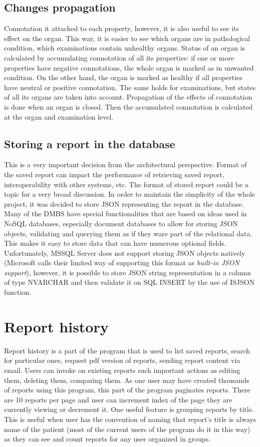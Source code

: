 \documentclass[12pt, twoside, openany]{report}
\theoremstyle{definition}
\begin{document}
\subsection{Changes propagation}
Connotation it attached to each property, however, it is also useful to see its effect on the organ. This way, it is easier to see which organs are in pathological condition, which examinations contain unhealthy organs. Status of an organ is calculated by accumulating connotation of all its properties: if one or more properties have negative connotations, the whole organ is marked as in unwanted condition. On the other hand, the organ is marked as healthy if all properties have neutral or positive connotation.
The same holds for examinations, but states of all its organs are taken into account. Propagation of the effects of connotation is done when an organ is closed. Then the accumulated connotation is calculated at the organ and examination level.

\subsection{Storing a report in the database}
This is a very important decision from the architectural perspective. Format of the saved report can impact the performance of retrieving saved report, interoperability with other systems, etc. The format of stored report could be a topic for a very broad discussion. In order to maintain the simplicity of the whole project, it was decided to store JSON representing the report in the database. Many of the DMBS have special functionalities that are based on ideas used in NoSQL databases, especially document databases to allow for storing JSON objects, validating and querying them as if they ware part of the relational data. This makes it easy to store data that can have numerous optional fields. Unfortunately, MSSQL Server does not support storing JSON objects natively (Microsoft calls their limited way of supporting this format as \textit{built-in JSON support}\cite{microsoft-json-support}), however, it is possible to store JSON string representation in a column of type NVARCHAR and then validate it on SQL INSERT by the use of ISJSON function.

\section{Report history}
Report history is a part of the program that is used to list saved reports, search for particular ones, request pdf version of reports, sending report content via email. Users can invoke on existing reports such important actions as editing them, deleting them, comparing them. As one user may have created thousands of reports using this program, this part of the program paginates reports. There are 10 reports per page and user can increment index of the page they are currently viewing or decrement it. 
One useful feature is grouping reports by title. This is useful when user has the convention of naming that report's title is always name of the patient (most of the current users of the program do it in this way) as they can see and count reports for any user organized in groups. 
\end{document}
